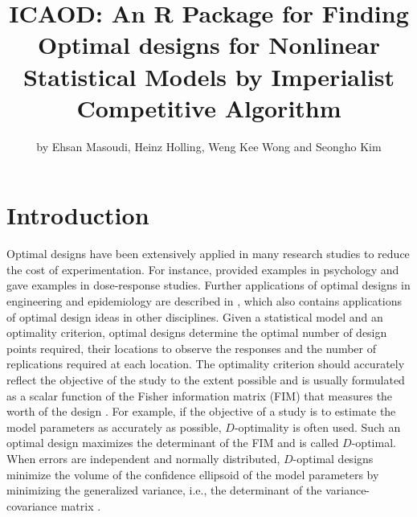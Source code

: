\title{ICAOD: An R Package for Finding Optimal designs for Nonlinear Statistical Models by Imperialist Competitive Algorithm}
\author{by Ehsan Masoudi, Heinz Holling, Weng Kee Wong and Seongho Kim}

\maketitle


\section{Introduction}\label{sec:intro}
Optimal designs have been extensively applied in many research studies to reduce the cost of experimentation.   For instance,
\citet{holling2013introduction} provided examples  in psychology and \citet{dette2010optimal} gave examples in dose-response studies. Further applications of optimal designs in engineering and epidemiology are described in \citet{bergerwong2009},  which also contains applications of optimal design ideas  in other disciplines.
Given a statistical model and an optimality criterion, optimal designs determine the  optimal number of design points required,  their locations  to observe the responses and the  number of replications required at each location.  The
optimality criterion should accurately reflect the objective of the study to the extent possible and is usually formulated as a scalar function of  the Fisher information matrix (FIM) that measures the worth of the design \citep{lehmann1998theory}.
For example, if the objective of a study is to estimate the model parameters as accurately as possible, $ D$-optimality is often used.  Such an optimal design maximizes the determinant of the FIM and is called $D$-optimal.  When errors are independent and normally distributed, $D$-optimal designs minimize the volume of the confidence ellipsoid of the model parameters by minimizing the generalized variance, i.e.,  the determinant of the variance-covariance matrix \citep{abdelbasit1983}.

